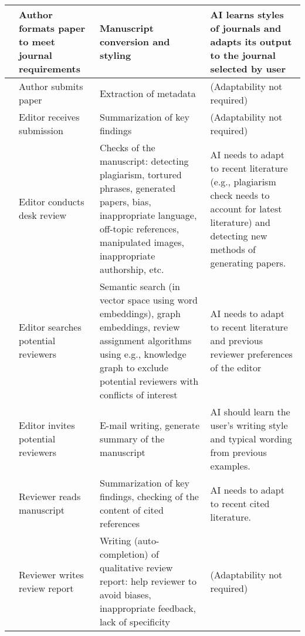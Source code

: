\begin{landscape}
\begin{table}[htb]
\begin{tabularx}{\linewidth}{L{0.05} L{0.2} L{0.35} L{0.35}}
             & Author formats paper to meet journal requirements & Manuscript conversion and styling & 
                AI learns styles of journals and adapts its output to the journal selected by user \\
            \midrule

             & Author submits paper & Extraction of metadata & (Adaptability not required) \\
            \midrule
            
             & Editor receives submission & Summarization of key findings & (Adaptability not required) \\
            \midrule
            
             & Editor conducts desk review & Checks of the manuscript: detecting plagiarism, tortured phrases,
                generated papers, bias, inappropriate language, off-topic references, manipulated images, inappropriate authorship, etc.
                & AI needs to adapt to recent literature (e.g., plagiarism check needs
                to account for latest literature) and detecting new methods of generating papers.\\ 
            \midrule

             & Editor searches potential reviewers & Semantic search (in vector space using word embeddings), graph embeddings,
                review assignment algorithms using e.g., knowledge graph to exclude potential reviewers with conflicts of interest & AI needs to
                adapt to recent literature and previous reviewer preferences of the editor \\ 
            \midrule

             & Editor invites potential reviewers & E-mail writing, generate summary of the manuscript &
                AI should learn the user's writing style and typical wording from previous examples. \\
            \midrule

             & Reviewer reads manuscript & Summarization of key findings, checking of the content of cited references &
                AI needs to adapt to recent cited literature. \\ 
            \midrule

             & Reviewer writes review report & Writing (auto-completion) of qualitative review report: help reviewer to avoid biases,
                inappropriate feedback, lack of specificity & (Adaptability not required) \\ 
            \midrule


\end{tabularx}
\end{table}
\end{landscape}

